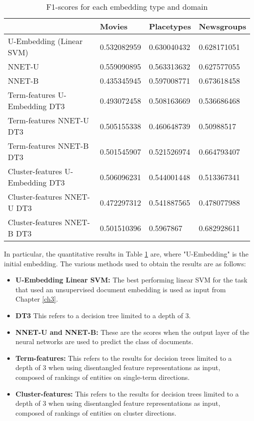 \begin{table}[]
	\centering
\begin{tabular}{llll}
		& \textbf{Movies}      & \textbf{Placetypes}  & \textbf{Newsgroups}  \\
	\toprule
	U-Embedding (Linear SVM)   & 0.532082959 & 0.630040432 & 0.628171051 \\
	NNET-U                      & 0.559090895 & 0.563313632 & 0.627577055 \\
	NNET-B                      & 0.435345945 & 0.597008771 & 0.673618458 \\
	Term-features U-Embedding DT3 & 0.493072458 & 0.508163669 & 0.536686468 \\
	Term-features NNET-U DT3       & 0.505155338 & 0.460648739 & 0.50988517  \\
	Term-features NNET-B DT3       & 0.501545907 & 0.521526974 & 0.664793407 \\
	Cluster-features U-Embedding DT3   & 0.506096231 & 0.544001448 & 0.513367341 \\
	Cluster-features NNET-U DT3         & 0.472297312 & 0.541887565 & 0.478077988 \\
	Cluster-features NNET-B DT3         & 0.501510396 & 0.5967867   & 0.682928611
\end{tabular}\caption{F1-scores for each embedding type and domain}\label{ch5:quantresults}
\end{table}

In particular, the quantitative results in Table \ref{ch5:quantresults} are, where "U-Embedding" is the initial embedding. The various methods used to obtain the results are as follows:

\begin{itemize}
	\item \textbf{U-Embedding Linear SVM:} The best performing linear SVM for the task that used an unsupervised document embedding is used as input  from Chapter \ref{ch3}.
	\item \textbf{DT3} This refers to a decision tree limited to a depth of 3.
	\item \textbf{NNET-U and NNET-B:} These are the scores when the output layer of the neural networks are used to predict the class of documents. 
	\item \textbf{Term-features:} This refers to the results for decision trees limited to a depth of 3 when using  disentangled feature representations as input, composed of rankings of entities on single-term directions.
	\item \textbf{Cluster-features:} This refers to the results for decision trees limited to a depth of 3 when using  disentangled feature representations as input, composed of rankings of entities on cluster directions.
\end{itemize}

